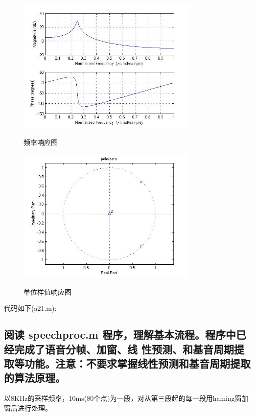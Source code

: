 \documentclass{ctexart}
\begin{document}
\begin{figure}
    \centering
    \includegraphics[width=0.8\textwidth]{1_freqz.jpg}\\
    \caption{频率响应图\label{1freq}}
\end{figure}

\begin{figure}
    \centering
    \includegraphics[width=0.8\textwidth]{1_zp.jpg}\\
    \caption{单位样值响应图\label{lir}}
\end{figure}

代码如下(a21.m):


\subsection{
    阅读 speechproc.m 程序，理解基本流程。程序中已经完成了语音分帧、加窗、线
    性预测、和基音周期提取等功能。注意：不要求掌握线性预测和基音周期提取的算法原理。
}

以8KHz的采样频率，10ms(80个点)为一段，对从第三段起的每一段用haming窗加窗后进行处理。
\end{document}
